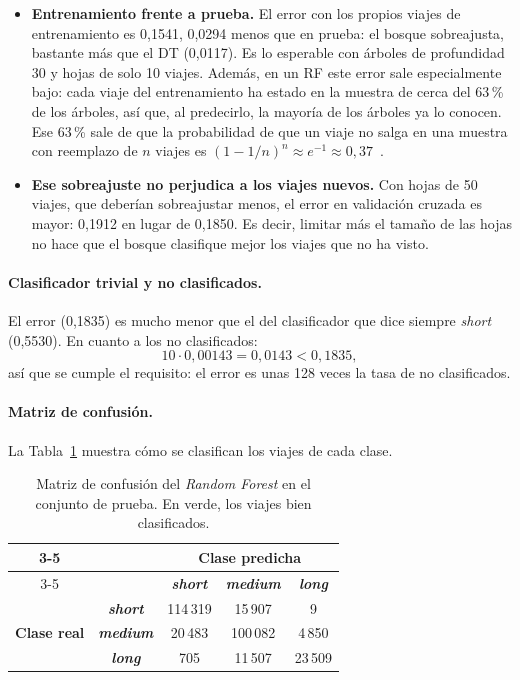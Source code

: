 \documentclass[12pt,a4paper]{article}
\begin{document}
\begin{itemize}
        \item \textbf{Entrenamiento frente a prueba.} El error con los propios
    viajes de entrenamiento es 0,1541, 0,0294 menos que en prueba: el
    bosque sobreajusta, bastante más que el \ac{DT} (0,0117). Es lo
    esperable con árboles de profundidad 30 y hojas de solo 10 viajes.
    Además, en un \ac{RF} este error sale especialmente bajo: cada viaje del
    entrenamiento ha estado en la muestra de cerca del 63\,\% de los
    árboles, así que, al predecirlo, la mayoría de los árboles ya lo
    conocen. Ese 63\,\% sale de que la probabilidad de que un viaje no
    salga en una muestra con reemplazo de $n$ viajes es
    $(1 - 1/n)^n \approx e^{-1} \approx 0{,}37$~\cite[sec.~2.4]{raschka2018}.
    \item \textbf{Ese sobreajuste no perjudica a los viajes nuevos.} Con hojas
    de 50 viajes, que deberían sobreajustar menos, el error en validación
    cruzada es mayor: 0,1912 en lugar de 0,1850. Es decir, limitar más el
    tamaño de las hojas no hace que el bosque clasifique mejor los viajes
    que no ha visto.
\end{itemize}

\paragraph{Clasificador trivial y no clasificados.} El error (0,1835) es mucho menor que el del
clasificador que dice siempre \textit{short} (0,5530). En cuanto a los no
clasificados:
\[
10 \cdot 0{,}00143 = 0{,}0143 < 0{,}1835 ,
\]
así que se cumple el requisito: el error es unas 128 veces la tasa de no
clasificados.

\paragraph{Matriz de confusión.} La Tabla~\ref{tab:cm-rf} muestra cómo se
clasifican los viajes de cada clase.

\begin{table}[H]
\centering
\renewcommand{\arraystretch}{1.2}
\begin{tabular}{cc|c|c|c|}
\cline{3-5}
& & \multicolumn{3}{c|}{\textbf{Clase predicha}} \\
\cline{3-5}
& & \textit{\textbf{short}} & \textit{\textbf{medium}} & \textit{\textbf{long}} \\
\hline
\multicolumn{1}{|c|}{\multirow{3}{*}{\textbf{Clase real}}} & \textit{\textbf{short}} & \cellcolor{green!25}114\,319 & 15\,907 & 9 \\
\cline{2-5}
\multicolumn{1}{|c|}{} & \textit{\textbf{medium}} & 20\,483 & \cellcolor{green!25}100\,082 & 4\,850 \\
\cline{2-5}
\multicolumn{1}{|c|}{} & \textit{\textbf{long}} & 705 & 11\,507 & \cellcolor{green!25}23\,509 \\
\hline
\end{tabular}
\caption{Matriz de confusión del \textit{Random Forest} en el conjunto de
prueba. En verde, los viajes bien clasificados.}
\label{tab:cm-rf}
\end{table}
\end{document}
